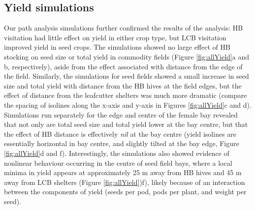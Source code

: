 \documentclass[12pt]{article} %
\begin{document}
\subsection*{Yield simulations}

Our path analysis simulations further confirmed the results of the analysis: HB visitation had little effect on yield in either crop type, but LCB visitation improved yield in seed crops.
The simulations showed no large effect of HB stocking on seed size or total yield in commodity fields (Figure \ref{fig:allYield}a and b, respectively), aside from the effect associated with distance from the edge of the field.
Similarly, the simulations for seed fields showed a small increase in seed size and total yield with distance from the HB hives at the field edges, but the effect of distance from the leafcutter shelters was much more dramatic (compare the spacing of isolines along the x-axis and y-axis in Figures \ref{fig:allYield}c and d).
Simulations run separately for the edge and centre of the female bay revealed that not only are total seed size and total yield lower at the bay centre, but that the effect of HB distance is effectively \emph{nil} at the bay centre (yield isolines are essentially horizontal in bay centre, and slightly tilted at the bay edge, Figure \ref{fig:allYield}d and f).
Interestingly, the simulations also showed evidence of nonlinear behaviour occurring in the centre of seed field bays, where a local minima in yield appears at approximately 25 m away from HB hives and 45 m away from LCB shelters (Figure \ref{fig:allYield})f), likely because of an interaction between the components of yield (seeds per pod, pods per plant, and weight per seed). 
\end{document}
